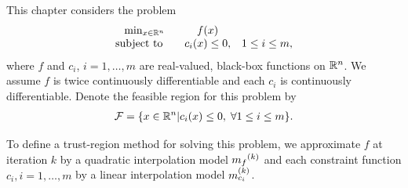 \label{infeasible_point_strategies}

%


This chapter considers the problem
\begin{align}
\begin{array}{ccl} \min_{x \in \mathbb R^n} & f(x) \\
\mbox{subject to} \quad & c_i(x) \le 0, & 1 \le i \le m,
\end{array}
\label{nonlinear_dfo_problem}
\end{align}
where $f$ and $c_i$, $i=1,\ldots,m$ are real-valued, black-box functions on $\mathbb R^n$.   We assume $f$ is twice continuously differentiable and each $c_i$ is continuously differentiable.   Denote the feasible region for this problem by
\begin{align}\label{define_feasible}
{\mathcal F} = \{x \in \mathbb R^n | c_i(x) \le 0, \; \forall 1 \le i \le m \}. 
\end{align}

To define a trust-region method for solving this problem,  we approximate $f$ at iteration $k$ by a quadratic interpolation model ${{m}_f}^{(k)}$ and each constraint function $c_i,  i=1,\ldots,m$ by a linear interpolation model ${{m}^{(k)}_{c_i}}$.     

